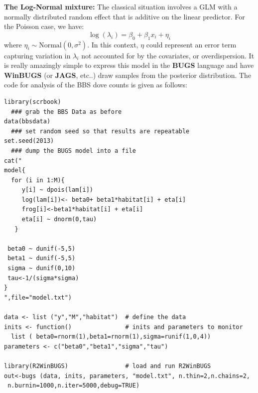 {\bf The Log-Normal mixture:} The classical situation involves a GLM
with a normally distributed random effect that is additive on the
linear predictor. For the Poisson case, we have:
\[
 	\log(\lambda_{i}) = \beta_0  + \beta_1 x_{i} + \eta_{i}
\]
where $\eta_{i} \sim \mbox{Normal}(0,\sigma^{2})$. In this context, $\eta$ could represent an error term capturing variation in $\lambda_{i}$ not accounted for by the covariates, or overdispersion. 
It is really amazingly simple to
express this model in the {\bf BUGS} language and have {\bf WinBUGS}
(or {\bf JAGS}, etc..) draw
samples from the posterior distribution. The code for analysis of the
BBS dove counts is given as follows:
{\small
\begin{verbatim} 
library(scrbook)
  ### grab the BBS Data as before
data(bbsdata)
  ### set random seed so that results are repeatable
set.seed(2013)
  ### dump the BUGS model into a file
cat("
model{
  for (i in 1:M){
     y[i] ~ dpois(lam[i])
     log(lam[i])<- beta0+ beta1*habitat[i] + eta[i]
     frog[i]<-beta1*habitat[i] + eta[i]
     eta[i] ~ dnorm(0,tau)
   }

 beta0 ~ dunif(-5,5)
 beta1 ~ dunif(-5,5)
 sigma ~ dunif(0,10)
 tau<-1/(sigma*sigma)
}
",file="model.txt")

data <- list ("y","M","habitat")  # define the data 
inits <- function()               # inits and parameters to monitor
  list ( beta0=rnorm(1),beta1=rnorm(1),sigma=runif(1,0,4))
parameters <- c("beta0","beta1","sigma","tau")

library(R2WinBUGS)                # load and run R2WinBUGS 
out<-bugs (data, inits, parameters, "model.txt", n.thin=2,n.chains=2,
 n.burnin=1000,n.iter=5000,debug=TRUE)
\end{verbatim}
}

